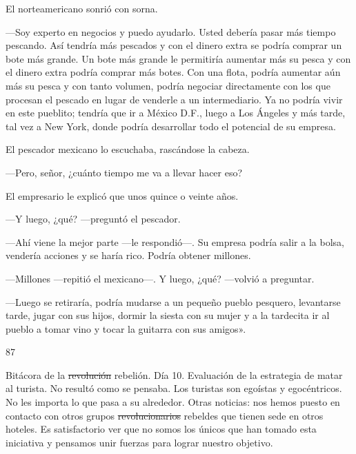 \documentclass[12pt,twoside,openright,a5paper]{book}
\begin{document}
El norteamericano sonrió con sorna. 

---Soy experto en negocios y puedo
ayudarlo. Usted debería pasar más tiempo pescando. Así tendría más
pescados y con el dinero extra se podría comprar un bote más grande. Un
bote más grande le permitiría aumentar más su pesca y con el dinero
extra podría comprar más botes. Con una flota, podría aumentar aún más su
pesca y con tanto volumen, podría negociar directamente con los que procesan
el pescado en lugar de venderle a un intermediario. Ya no podría vivir en
este pueblito; tendría que ir a México D.F., luego a Los Ángeles y más tarde,
tal vez a New York, donde podría desarrollar todo el potencial de su empresa.

El pescador mexicano lo escuchaba, rascándose la cabeza. 

---Pero, señor, ¿cuánto tiempo me va a llevar hacer eso? 

El empresario le explicó que unos quince o veinte años.

---Y luego, ¿qué? ---preguntó el pescador. 

---Ahí viene la mejor parte ---le respondió---. Su empresa podría salir a la bolsa,
vendería acciones y se haría rico. Podría obtener millones. 

---Millones ---repitió el mexicano---. Y luego, ¿qué? ---volvió a preguntar.

---Luego se retiraría,
podría mudarse a un pequeño pueblo pesquero, levantarse tarde, jugar con
sus hijos, dormir la siesta con su mujer y a la tardecita ir al pueblo a
tomar vino y tocar la guitarra con sus amigos».

\vspace{0.5cm}

\hrulefill \hspace{0.1cm}\decofourleft\hspace{0.2cm} 87 \hspace{0.2cm}\decofourright \hspace{0.1cm}\hrulefill

\nopagebreak

\vspace{0.5cm}

\nopagebreak

Bitácora de la \st{revolución} rebelión. Día 10. Evaluación de la estrategia de
matar al turista. No resultó como se pensaba. Los turistas son egoístas y
egocéntricos. No les importa lo que pasa a su alrededor. Otras noticias:
nos hemos puesto en contacto con otros grupos \st{revolucionarios}
rebeldes que tienen
sede en otros hoteles. Es satisfactorio ver que no somos los únicos que han
tomado esta iniciativa y pensamos unir fuerzas para lograr nuestro objetivo.
\end{document}
